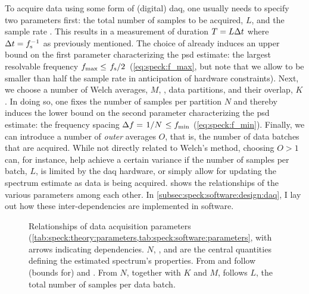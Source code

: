 To acquire data using some form of (digital) \gls{daq}, one usually needs to specify two parameters first: the total number of samples to be acquired, $L$, and the sample rate \fs.
This results in a measurement of duration $T = L\Delta t$ where $\Delta t = f_{\mathrm{s}}^{-1}$ as previously mentioned.
The choice of \fs already induces an upper bound on the first parameter characterizing the \gls{psd} estimate: the largest resolvable frequency $\fmax\leq\flatfrac{\fs}{2}$ (\cf \cref{eq:speck:f_max}, but note that we allow \fmax to be smaller than half the sample rate in anticipation of hardware constraints).
Next, we choose a number of Welch averages, $M$, \ie, data partitions, and their overlap, $K$.
In doing so, one fixes the number of samples per partition $N$ and thereby induces the lower bound on the second parameter characterizing the \gls{psd} estimate: the frequency spacing $\df = \flatfrac{1}{N} \leq \fmin$ (\cf \cref{eq:speck:f_min}).
Finally, we can introduce a number of \emph{outer} averages $O$, that is, the number of data batches that are acquired.
While not directly related to Welch's method, choosing $O > 1$ can, for instance, help achieve a certain variance if the number of samples per batch, $L$, is limited by the \acrlong{daq} hardware, or simply allow for updating the spectrum estimate as data is being acquired.
 shows the relationships of the various parameters among each other.
In \cref{subsec:speck:software:design:daq}, I lay out how these inter-dependencies are implemented in software.

\begin{figure}
    \centering
    
    \caption{
        Relationships of data acquisition parameters (\cf \cref{tab:speck:theory:parameters,tab:speck:software:parameters}, with arrows indicating dependencies.
        $N$, \fs, and \df are the central quantities defining the estimated spectrum's properties.
        From \fs and \df follow (bounds for) \fmax and \fmin.
        From $N$, together with $K$ and $M$, follows $L$, the total number of samples per data batch.
    }
    \label{fig:speck:theory:parameters}
\end{figure}

